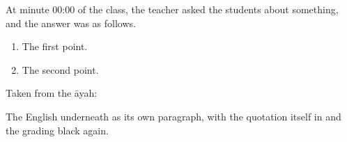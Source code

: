 \documentclass[12pt]{article}
\begin{document}

At minute 00:00 of the class, the teacher asked the students about
something, and the answer was as follows.

\begin{enumerate}
  \item The first point.
  \item The second point.
\end{enumerate}

Taken from the āyah:

\begin{ayah}
\end{ayah}

\divider


The English underneath as its own paragraph, with the quotation itself
in  and the grading black again.
\end{document}
